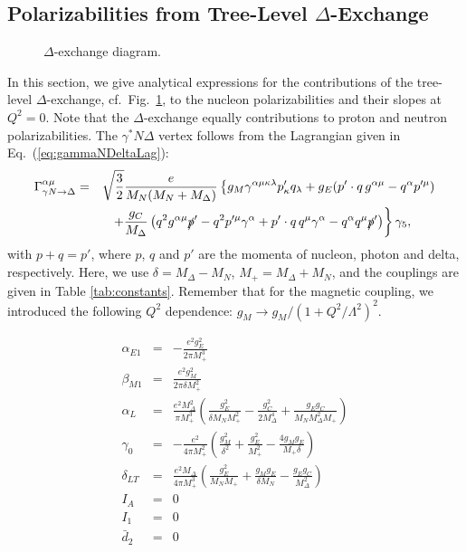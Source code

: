 \documentclass[twocolumn,prc,showpacs,nofootinbib,preprintnumbers,amsmath,amssymb,superscriptaddress]{revtex4-1}
\def\bea{\begin{eqnarray}}
\def\eea{\end{eqnarray}}
\def\eqlab#1{\label{eq:#1}}
\def\Eqref#1{Eq.~(\ref{eq:#1})}
\def\al{\alpha}
\def\be{\beta}
\def\nn{\nonumber}
\begin{document}
\begin{widetext}
{}

\subsection{Polarizabilities from Tree-Level $\Delta$-Exchange}

\begin{figure}
\caption{$\Delta$-exchange diagram. \label{DeltaExchange}}
\end{figure}
In this section, we give analytical expressions for the contributions of the tree-level $\Delta$-exchange, cf.\ Fig.~\ref{DeltaExchange}, to the nucleon polarizabilities and their slopes at $Q^2=0$. Note that the $\Delta$-exchange equally contributions to proton and neutron polarizabilities. The $\gamma^* N \Delta$ vertex follows from the Lagrangian given in \Eqref{gammaNDeltaLag}:
\bea
\Gamma_{\gamma N \rightarrow \Delta}^{\al \mu}&=&\sqrt{\frac{3}{2}}\frac{e}{M_N(M_N+M_\Delta)}\left\{g_M \gamma^{\al \mu \kappa \lambda}p'_\kappa q_\lambda+g_E (p'\cdot q\, g^{\al \mu}-q^\al p^{\prime\mu})\right.\\
&&\left.+\frac{g_C}{M_\Delta} \left(q^2 g^{ \al \mu}\slashed{p}'-q^2 p^{\prime\mu} \gamma^\al +p'\cdot q \,q^\mu \gamma^\al-q^\al q^\mu \slashed{p}'\right)\right\}\gamma_5,\qquad\nn
\eea
with $p+q=p'$, where $p$, $q$ and $p'$ are the momenta of nucleon, photon and delta, respectively. Here, we use $\delta = M_\Delta - M_N$, $M_+=M_\Delta+M_N$, and the couplings are given in Table \ref{tab:constants}.  Remember that for the magnetic coupling, we introduced the following $Q^2$ dependence: $g_M \rightarrow g_M/(1+Q^2/\Lambda^2)^2$.


\bea
\eqlab{alphabetaQ2}
\al_{E1}&=&-\frac{e^2 g_E^2}{2 \pi  M_+^3}\\
\be_{M1}&=&\frac{e^2 g_M^2}{2 \pi  \delta  M_+^2}\\
\al_L&=&\frac{e^2 M_\Delta^2}{\pi M_+^3}\left(\frac{ g_E^2}{\delta  M_NM_+^2}-\frac{g_C^2}{2 M_\Delta^4}+\frac{ g_E g_C}{M_NM_\Delta^2 M_+}\right)\\
\gamma_0&=&-\frac{e^2}{4\pi M_+^2}\left(\frac{g_M^2}{\delta^2}+\frac{g_E^2}{M_+^2}-\frac{4g_M g_E}{M_+\delta}\right)\\
\delta_{LT}&=&\frac{e^2 M_\Delta}{4\pi M_+^3}\left(\frac{g_E^2 }{M_N M_+}+\frac{g_M g_E }{\delta M_N}-\frac{g_E g_C}{M_\Delta^2}\right)\\
I_A&=&0\eqlab{IAstatic}\\
I_1&=&0\eqlab{I1static}\\
\bar d_2&=&0
\eea


\end{widetext}
\end{document}
